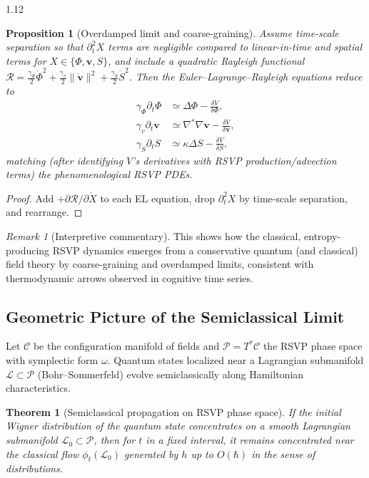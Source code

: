 \documentclass[12pt,a4paper]{article}
\numberwithin{equation}{section}
\newtheorem{proposition}{Proposition}[section]
\newtheorem{theorem}{Theorem}[section]
\theoremstyle{remark}
\newtheorem{remark}{Remark}[section]
\theoremstyle{definition}
\begin{document}
\begin{spacing}{1.12}
\begin{proposition}[Overdamped limit and coarse-graining]\label{prop:D-overdamped}
Assume time-scale separation so that $\partial_t^2 X$ terms are negligible compared to linear-in-time and spatial terms for $X\in\{\Phi,\mathbf{v},S\}$, and include a quadratic Rayleigh functional $\mathcal{R}=\tfrac{\gamma_\Phi}{2}\dot{\Phi}^2+\tfrac{\gamma_v}{2}\|\dot{\mathbf{v}}\|^2+\tfrac{\gamma_S}{2}\dot{S}^2$. Then the Euler--Lagrange--Rayleigh equations reduce to
\begin{align}
\gamma_\Phi \partial_t \Phi &\simeq \Delta \Phi - \frac{\delta V}{\delta \Phi}, \\
\gamma_v \partial_t \mathbf{v} &\simeq \nabla^\ast\nabla \mathbf{v} - \frac{\delta V}{\delta \mathbf{v}}, \\
\gamma_S \partial_t S &\simeq \kappa \Delta S - \frac{\delta V}{\delta S},
\end{align}
matching (after identifying $V$'s derivatives with RSVP production/advection terms) the phenomenological RSVP PDEs.
\end{proposition}

\begin{proof}
Add $+\partial \mathcal{R}/\partial \dot{X}$ to each EL equation, drop $\partial_t^2 X$ by time-scale separation, and rearrange.
\end{proof}

\begin{remark}[Interpretive commentary]
This shows how the classical, entropy-producing RSVP dynamics emerges from a conservative quantum (and classical) field theory by coarse-graining and overdamped limits, consistent with thermodynamic arrows observed in cognitive time series.
\end{remark}

\subsection{Geometric Picture of the Semiclassical Limit}\label{sec:D-geom}

Let $\mathcal{C}$ be the configuration manifold of fields and $\mathcal{P}=T^\ast\!\mathcal{C}$ the RSVP phase space with symplectic form $\omega$. Quantum states localized near a Lagrangian submanifold $\mathcal{L}\subset\mathcal{P}$ (Bohr--Sommerfeld) evolve semiclassically along Hamiltonian characteristics.

\begin{theorem}[Semiclassical propagation on RSVP phase space]\label{thm:D-lagrangian}
If the initial Wigner distribution of the quantum state concentrates on a smooth Lagrangian submanifold $\mathcal{L}_0\subset \mathcal{P}$, then for $t$ in a fixed interval, it remains concentrated near the classical flow $\phi_t(\mathcal{L}_0)$ generated by $h$ up to $O(\hbar)$ in the sense of distributions.
\end{theorem}


\end{spacing}
\end{document}
